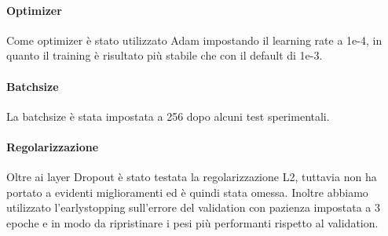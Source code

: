 \paragraph{Optimizer} Come optimizer è stato utilizzato Adam impostando il learning rate a 1e-4, in quanto il training è
risultato più stabile che con il default di 1e-3.

\paragraph{Batchsize} La batchsize è stata impostata a 256 dopo alcuni test
sperimentali.

\paragraph{Regolarizzazione} Oltre ai layer Dropout è stato testata la
regolarizzazione L2, tuttavia non ha portato a evidenti miglioramenti ed è
quindi stata omessa. Inoltre abbiamo utilizzato l'earlystopping sull'errore del
validation con pazienza impostata a 3 epoche e in modo da ripristinare i pesi
più performanti rispetto al validation.
